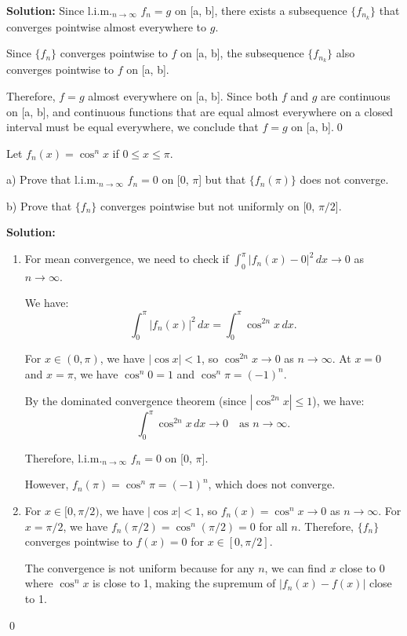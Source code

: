 \noindent\textbf{Solution:} Since l.i.m.\(_{n\to\infty}\) \( f_n = g \) on [a, b], there exists a subsequence \( \{f_{n_k}\} \) that converges pointwise almost everywhere to \( g \).

Since \( \{f_n\} \) converges pointwise to \( f \) on [a, b], the subsequence \( \{f_{n_k}\} \) also converges pointwise to \( f \) on [a, b].

Therefore, \( f = g \) almost everywhere on [a, b]. Since both \( f \) and \( g \) are continuous on [a, b], and continuous functions that are equal almost everywhere on a closed interval must be equal everywhere, we conclude that \( f = g \) on [a, b].\qed


\begin{problembox}
Let \( f_n(x) = \cos^n x \) if \( 0 \leq x \leq \pi \).

a) Prove that l.i.m.\(_{n\to\infty}\) \( f_n = 0 \) on [0, \(\pi\)] but that \( \{f_n(\pi)\} \) does not converge.

b) Prove that \( \{f_n\} \) converges pointwise but not uniformly on [0, \(\pi/2\)].
\end{problembox}

\noindent\textbf{Solution:}
\begin{enumerate}[label=(\alph*)]
\item For mean convergence, we need to check if \( \int_0^\pi |f_n(x) - 0|^2 \, dx \to 0 \) as \( n \to \infty \).

We have:
\[\int_0^\pi |f_n(x)|^2 \, dx = \int_0^\pi \cos^{2n} x \, dx.\]

For \( x \in (0, \pi) \), we have \( |\cos x| < 1 \), so \( \cos^{2n} x \to 0 \) as \( n \to \infty \). At \( x = 0 \) and \( x = \pi \), we have \( \cos^n 0 = 1 \) and \( \cos^n \pi = (-1)^n \).

By the dominated convergence theorem (since \( |\cos^{2n} x| \leq 1 \)), we have:
\[\int_0^\pi \cos^{2n} x \, dx \to 0 \quad \text{as } n \to \infty.\]

Therefore, l.i.m.\(_{n\to\infty}\) \( f_n = 0 \) on [0, \(\pi\)].

However, \( f_n(\pi) = \cos^n \pi = (-1)^n \), which does not converge.

\item For \( x \in [0, \pi/2) \), we have \( |\cos x| < 1 \), so \( f_n(x) = \cos^n x \to 0 \) as \( n \to \infty \). For \( x = \pi/2 \), we have \( f_n(\pi/2) = \cos^n(\pi/2) = 0 \) for all \( n \). Therefore, \( \{f_n\} \) converges pointwise to \( f(x) = 0 \) for \( x \in [0, \pi/2] \).

The convergence is not uniform because for any \( n \), we can find \( x \) close to 0 where \( \cos^n x \) is close to 1, making the supremum of \( |f_n(x) - f(x)| \) close to 1.
\end{enumerate}\qed


